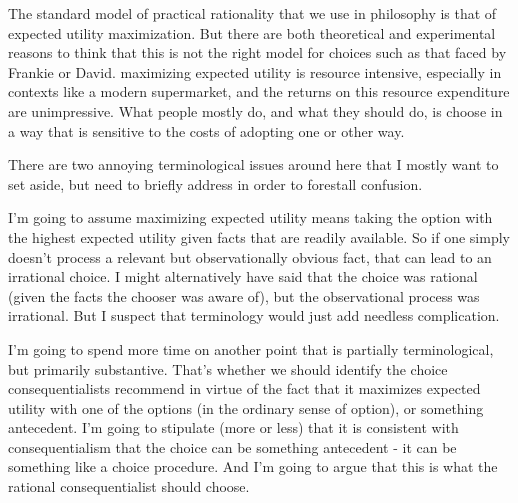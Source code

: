 \documentclass[
  11pt,
  letterpaper,
  DIV=11,
  numbers=noendperiod,
  oneside]{scrartcl}
\begin{document}
The standard model of practical rationality that we use in philosophy is
that of expected utility maximization. But there are both theoretical
and experimental reasons to think that this is not the right model for
choices such as that faced by Frankie or David. maximizing expected
utility is resource intensive, especially in contexts like a modern
supermarket, and the returns on this resource expenditure are
unimpressive. What people mostly do, and what they should do, is choose
in a way that is sensitive to the costs of adopting one or other way.

There are two annoying terminological issues around here that I mostly
want to set aside, but need to briefly address in order to forestall
confusion.

I'm going to assume maximizing expected utility means taking the option
with the highest expected utility given facts that are readily
available. So if one simply doesn't process a relevant but
observationally obvious fact, that can lead to an irrational choice. I
might alternatively have said that the choice was rational (given the
facts the chooser was aware of), but the observational process was
irrational. But I suspect that terminology would just add needless
complication.

I'm going to spend more time on another point that is partially
terminological, but primarily substantive. That's whether we should
identify the choice consequentialists recommend in virtue of the fact
that it maximizes expected utility with one of the options (in the
ordinary sense of option), or something antecedent. I'm going to
stipulate (more or less) that it is consistent with consequentialism
that the choice can be something antecedent - it can be something like a
choice procedure. And I'm going to argue that this is what the rational
consequentialist should choose.
\end{document}
